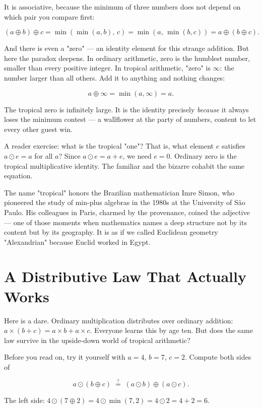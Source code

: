 It is associative, because the minimum of three numbers does not depend on which pair you compare first:

\[
(a \oplus b) \oplus c = \min(\min(a,b),\, c) = \min(a,\, \min(b,c)) = a \oplus (b \oplus c).
\]

And there is even a "zero" --- an identity element for this strange addition. But here the paradox deepens. In ordinary arithmetic, zero is the humblest number, smaller than every positive integer. In tropical arithmetic, "zero" is $\infty$: the number larger than all others. Add it to anything and nothing changes:

\[
a \oplus \infty = \min(a, \infty) = a.
\]

The tropical zero is infinitely large. It is the identity precisely \textit{because} it always loses the minimum contest --- a wallflower at the party of numbers, content to let every other guest win.

A reader exercise: what is the tropical "one"? That is, what element $e$ satisfies $a \odot e = a$ for all $a$? Since $a \odot e = a + e$, we need $e = 0$. Ordinary zero is the tropical multiplicative identity. The familiar and the bizarre cohabit the same equation.

The name "tropical" honors the Brazilian mathematician Imre Simon, who pioneered the study of min-plus algebras in the 1980s at the University of São Paulo. His colleagues in Paris, charmed by the provenance, coined the adjective --- one of those moments when mathematics names a deep structure not by its content but by its geography. It is as if we called Euclidean geometry "Alexandrian" because Euclid worked in Egypt.

\bigskip

\section*{A Distributive Law That Actually Works}

Here is a dare. Ordinary multiplication distributes over ordinary addition: $a \times (b + c) = a \times b + a \times c$. Everyone learns this by age ten. But does the same law survive in the upside-down world of tropical arithmetic?

Before you read on, try it yourself with $a = 4$, $b = 7$, $c = 2$. Compute both sides of

\[
a \odot (b \oplus c) \;\stackrel{?}{=}\; (a \odot b) \oplus (a \odot c).
\]

The left side: $4 \odot (7 \oplus 2) = 4 \odot \min(7,2) = 4 \odot 2 = 4 + 2 = 6$.

